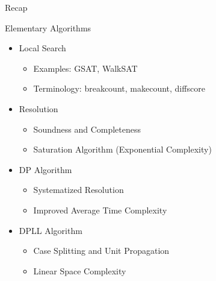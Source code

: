 \documentclass[t]{sdqbeamer}
\begin{document}
\begin{frame}{Recap}
	\begin{block}{Elementary Algorithms}
		\begin{itemize}\setlength{\itemsep}{1ex}
			\item Local Search
			\begin{itemize}
				\item Examples: GSAT, WalkSAT
				\item Terminology: breakcount, makecount, diffscore
			\end{itemize}
			\item Resolution
			\begin{itemize}
				\item Soundness and Completeness
				\item Saturation Algorithm (Exponential Complexity)
			\end{itemize}
			\item DP Algorithm
			\begin{itemize}
				\item Systematized Resolution
				\item Improved Average Time Complexity
			\end{itemize}
			\item DPLL Algorithm
			\begin{itemize}
				\item Case Splitting and Unit Propagation
				\item Linear Space Complexity
			\end{itemize}
		\end{itemize}
	\end{block}
\end{frame}
\end{document}
